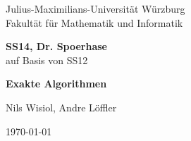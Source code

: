 \begin{titlepage}
  Julius-Maximilians-Universität Würzburg\\
  Fakultät für Mathematik und Informatik
  
  \vspace{3cm}
  
  \begin{center}
   \LARGE\textbf{SS14, Dr. Spoerhase}
   \\auf Basis von SS12
  \end{center}
  
  \vspace{0cm}
  
  \begin{center}
   \huge\textbf{Exakte Algorithmen}
  \end{center}
  
  \vspace{1cm}
  
  \begin{center}
   \Large Nils Wisiol, Andre Löffler
  \end{center}
  
  \vspace{0cm}
  
  \begin{center}
   \Large \today
  \end{center}
  
  
\end{titlepage}
